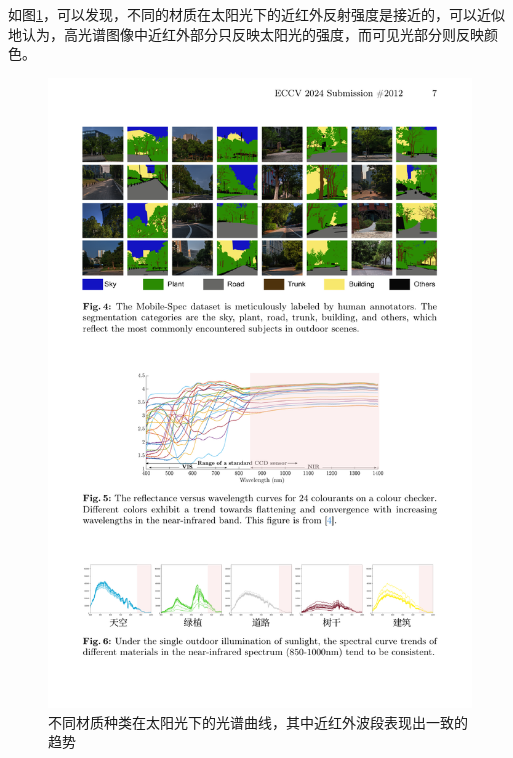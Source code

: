 \documentclass[
    type = master, %
    degree = academic,        %
    decl-page,  %
  ]{njuthesis}
\begin{document}
如图\ref{fig:enhance category curve}，可以发现，不同的材质在太阳光下的近红外反射强度是接近的，可以近似地认为，高光谱图像中近红外部分只反映太阳光的强度，而可见光部分则反映颜色。
\begin{figure}[h]
	\centering
	\includegraphics[width=1.0\linewidth]{docs/fig-chap3/fig-3-category-curve.pdf}
	\caption{不同材质种类在太阳光下的光谱曲线，其中近红外波段表现出一致的趋势}
	\label{fig:enhance category curve}
\end{figure}
\end{document}
